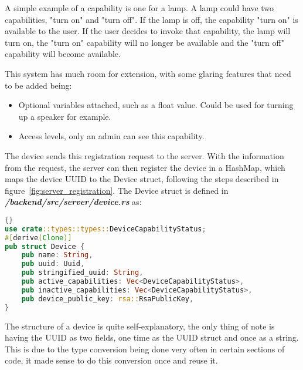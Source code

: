 A simple example of a capability is one for a lamp. A lamp could have two capabilities, "turn on" and "turn off". If the lamp is off, the capability "turn on" is available to the user. If the user decides to invoke that capability, the lamp will turn on, the "turn on" capability will no longer be available and the "turn off" capability will become available. 

This system has much room for extension, with some glaring features that need to be added being:
\begin{itemize}
    \item Optional variables attached, such as a float value. Could be used for turning up a speaker for example.
    \item Access levels, only an admin can see this capability.
\end{itemize}

The device sends this registration request to the server. With the information from the request, the server can then register the device in a HashMap, which maps the device UUID to the Device struct, following the steps described in figure~\ref{fig:server_registration}. The Device struct is defined in \textit{\textbf{/backend/src/server/device.rs}} as:
\begin{lstlisting}[language=Rust, style=boxed, showstringspaces=false]{}
use crate::types::types::DeviceCapabilityStatus;
#[derive(Clone)]
pub struct Device {
    pub name: String,
    pub uuid: Uuid,
    pub stringified_uuid: String,
    pub active_capabilities: Vec<DeviceCapabilityStatus>,
    pub inactive_capabilities: Vec<DeviceCapabilityStatus>,
    pub device_public_key: rsa::RsaPublicKey,
}
\end{lstlisting}
The structure of a device is quite self-explanatory, the only thing of note is having the UUID as two fields, one time as the UUID struct and once as a string. This is due to the type conversion being done very often in certain sections of code, it made sense to do this conversion once and reuse it.  

